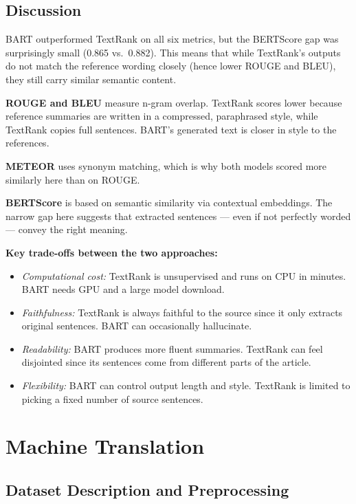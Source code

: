 \documentclass[12pt,a4paper]{article}
\begin{document}
\subsection{Discussion}

BART outperformed TextRank on all six metrics, but the BERTScore gap was
surprisingly small (0.865 vs.\ 0.882). This means that while TextRank's outputs
do not match the reference wording closely (hence lower ROUGE and BLEU), they
still carry similar semantic content.

\textbf{ROUGE and BLEU} measure n-gram overlap. TextRank scores lower because
reference summaries are written in a compressed, paraphrased style, while
TextRank copies full sentences. BART's generated text is closer in style to
the references.

\textbf{METEOR} uses synonym matching, which is why both models scored more
similarly here than on ROUGE.

\textbf{BERTScore} is based on semantic similarity via contextual embeddings.
The narrow gap here suggests that extracted sentences — even if not perfectly
worded — convey the right meaning.

\textbf{Key trade-offs between the two approaches:}
\begin{itemize}
    \item \textit{Computational cost:} TextRank is unsupervised and runs on CPU
    in minutes. BART needs GPU and a large model download.
    \item \textit{Faithfulness:} TextRank is always faithful to the source since
    it only extracts original sentences. BART can occasionally hallucinate.
    \item \textit{Readability:} BART produces more fluent summaries. TextRank
    can feel disjointed since its sentences come from different parts of the article.
    \item \textit{Flexibility:} BART can control output length and style.
    TextRank is limited to picking a fixed number of source sentences.
\end{itemize}

\section{Machine Translation}

\subsection{Dataset Description and Preprocessing}
\end{document}
